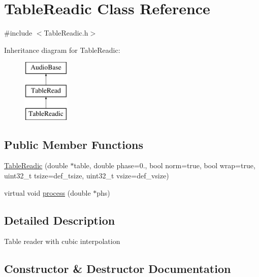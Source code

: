 \hypertarget{class_table_readic}{}\section{Table\+Readic Class Reference}
\label{class_table_readic}


{\ttfamily \#include $<$Table\+Readic.\+h$>$}

Inheritance diagram for Table\+Readic\+:\begin{figure}[H]
\begin{center}
\leavevmode
\includegraphics[height=3.000000cm]{class_table_readic}
\end{center}
\end{figure}
\subsection*{Public Member Functions}
\begin{DoxyCompactItemize}
\item 
\hyperlink{class_table_readic_a792cbe0b54c4adf39a9000f4ac3f7513}{Table\+Readic} (double $\ast$table, double phase=0., bool norm=true, bool wrap=true, uint32\+\_\+t tsize=def\+\_\+tsize, uint32\+\_\+t vsize=def\+\_\+vsize)
\item 
virtual void \hyperlink{class_table_readic_acc300e7cf5cf06af7d4aa06dde917f3c}{process} (double $\ast$phs)
\end{DoxyCompactItemize}


\subsection{Detailed Description}
Table reader with cubic interpolation 

\subsection{Constructor \& Destructor Documentation}
\mbox{\label{class_table_readic_a792cbe0b54c4adf39a9000f4ac3f7513}} 
